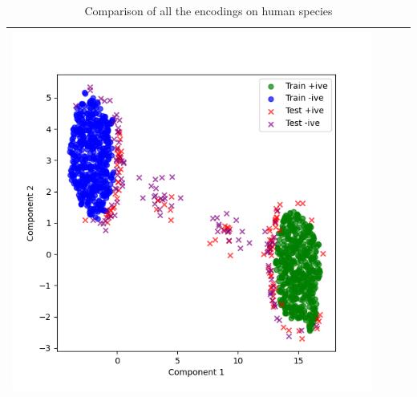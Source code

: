 \begin{table}[htbp]
\begin{tabularx}{\textwidth}{|p{1cm}|X|X|X|}
        \includegraphics[width=\linewidth]{images/encodings/unsupervised/human/plot_1_3} \\
        \hline
      \end{tabularx}
      \caption{Comparison of all the encodings on human species}\label{tab:dea-unsupervised-encodings-H}
    \end{table}


